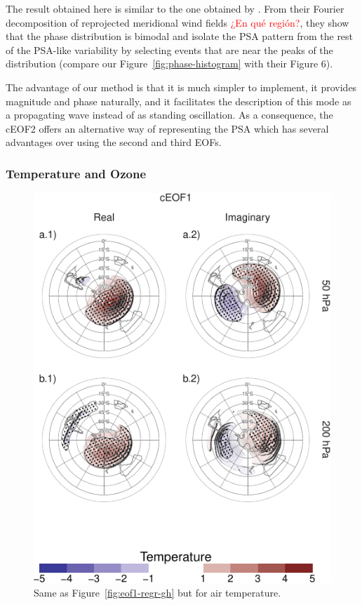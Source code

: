 \documentclass[smallextended]{svjour3}       %
\begin{document}
The result obtained here is similar to the one obtained by \citet{irving2016}.
From their Fourier decomposition of reprojected meridional wind fields \textcolor{red}{¿En qué región?}, they show that the phase distribution is bimodal and isolate the PSA pattern from the rest of the PSA-like variability by selecting events that are near the peaks of the distribution (compare our Figure~\ref{fig:phase-histogram} with their Figure 6).

The advantage of our method is that it is much simpler to implement, it provides magnitude and phase naturally, and it facilitates the description of this mode as a propagating wave instead of as standing oscillation.
As a consequence, the cEOF2 offers an alternative way of representing the PSA which has several advantages over using the second and third EOFs.

\hypertarget{temperature-and-ozone}{%
\subsubsection{Temperature and Ozone}\label{temperature-and-ozone}}



\begin{figure}
\centering
\includegraphics{../figures/eof1-regr-t-1.pdf}
\caption{\label{fig:eof1-regr-t}Same as Figure~\ref{fig:eof1-regr-gh} but for air temperature.}
\end{figure}
\end{document}
